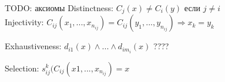 \documentclass{beamer}
\begin{document}
\begin{frame}[fragile]{TODO: аксиомы}
Distinctness: $C_{j}(x) \neq C_{i}(y)$ если $j \neq i$\\
Injectivity:
$C_{ij}(x_1,...,x_{n_{ij}}) = C_{ij}(y_1,...,y_{n_{ij}}) \Rightarrow x_k = y_k$

Exhaustiveness:
$d_{i1}(x) \wedge ... \wedge d_{im_i}(x)$ ????

Selection:
$s^k_{ij}(C_{ij}(x1,...,x_{n_{ij}}) = x$

\end{frame}
\end{document}
